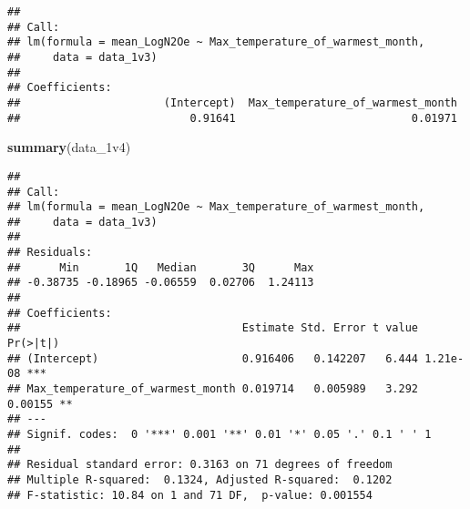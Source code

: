 \documentclass[
]{article}
\newenvironment{Shaded}{\begin{snugshade}}{\end{snugshade}}
\newcommand{\AttributeTok}[1]{\textcolor[rgb]{0.13,0.29,0.53}{#1}}
\newcommand{\FunctionTok}[1]{\textcolor[rgb]{0.13,0.29,0.53}{\textbf{#1}}}
\newcommand{\NormalTok}[1]{#1}
\newcommand{\OtherTok}[1]{\textcolor[rgb]{0.56,0.35,0.01}{#1}}
\newcommand{\SpecialCharTok}[1]{\textcolor[rgb]{0.81,0.36,0.00}{\textbf{#1}}}
\newcommand{\StringTok}[1]{\textcolor[rgb]{0.31,0.60,0.02}{#1}}
\begin{document}
\begin{Shaded}
\end{Shaded}

\begin{verbatim}
## 
## Call:
## lm(formula = mean_LogN2Oe ~ Max_temperature_of_warmest_month, 
##     data = data_1v3)
## 
## Coefficients:
##                      (Intercept)  Max_temperature_of_warmest_month  
##                          0.91641                           0.01971
\end{verbatim}

\begin{Shaded}
\begin{Highlighting}[]
\FunctionTok{summary}\NormalTok{(data\_1v4)}
\end{Highlighting}
\end{Shaded}

\begin{verbatim}
## 
## Call:
## lm(formula = mean_LogN2Oe ~ Max_temperature_of_warmest_month, 
##     data = data_1v3)
## 
## Residuals:
##      Min       1Q   Median       3Q      Max 
## -0.38735 -0.18965 -0.06559  0.02706  1.24113 
## 
## Coefficients:
##                                  Estimate Std. Error t value Pr(>|t|)    
## (Intercept)                      0.916406   0.142207   6.444 1.21e-08 ***
## Max_temperature_of_warmest_month 0.019714   0.005989   3.292  0.00155 ** 
## ---
## Signif. codes:  0 '***' 0.001 '**' 0.01 '*' 0.05 '.' 0.1 ' ' 1
## 
## Residual standard error: 0.3163 on 71 degrees of freedom
## Multiple R-squared:  0.1324, Adjusted R-squared:  0.1202 
## F-statistic: 10.84 on 1 and 71 DF,  p-value: 0.001554
\end{verbatim}
\end{document}
